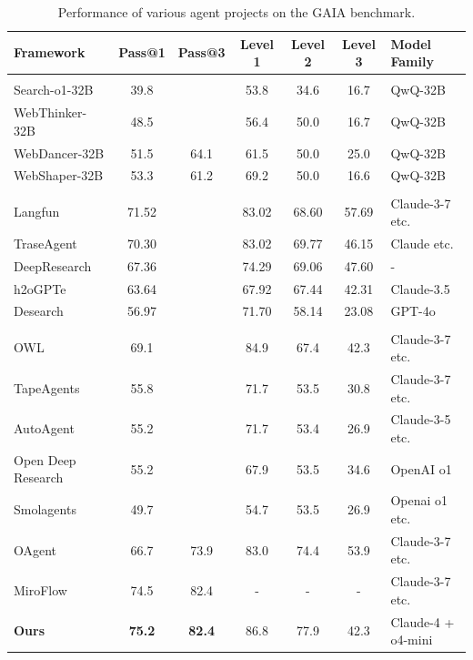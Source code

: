 \begin{table}[!thb]
\centering
\caption{Performance of various agent projects on the GAIA benchmark.}
\label{tab:related}
\begin{tabular}{lcccccl} 
\toprule
\midrule
\textbf{Framework} & \textbf{Pass@1} & \textbf{Pass@3} & \textbf{Level 1} & \textbf{Level 2} & \textbf{Level 3} & \textbf{Model Family} \\
\midrule
\multicolumn{7}{l}{\cellcolor[RGB]{235, 228, 230}{\emph{Agentic Model}}} \\
\midrule
Search-o1-32B
& 39.8 & & 53.8 & 34.6 & 16.7 & QwQ-32B \\
WebThinker-32B
& 48.5 & & 56.4 & 50.0 & 16.7 & QwQ-32B \\
WebDancer-32B
& 51.5 & 64.1 & 61.5 & 50.0 & 25.0 & QwQ-32B \\
WebShaper-32B
& 53.3 & 61.2 & 69.2 & 50.0 & 16.6 & QwQ-32B \\
\midrule
\multicolumn{7}{l}{\cellcolor[RGB]{235, 216, 221}{\emph{Closed-source Agent Frameworks}}} \\
\midrule
Langfun
& 71.52 & & 83.02 & 68.60 & 57.69 & Claude-3-7 etc.\@ \\
TraseAgent
& 70.30 & & 83.02 & 69.77 & 46.15 & Claude etc.\@ \\
DeepResearch
& 67.36 & & 74.29 & 69.06 & 47.60 & - \\
h2oGPTe
& 63.64 & & 67.92 & 67.44 & 42.31 & Claude-3.5  \\
Desearch
& 56.97 & & 71.70 & 58.14 & 23.08 & GPT-4o \\
\midrule
\multicolumn{7}{l}{\cellcolor[RGB]{235, 181, 195}{\emph{Open‐source Agent Frameworks}} }\\
\midrule
OWL
& 69.1 &  & 84.9  & 67.4 & 42.3 & Claude-3-7 etc.\@ \\
TapeAgents
& 55.8 & & 71.7 & 53.5 & 30.8 & Claude-3-7 etc.\@ \\
AutoAgent
& 55.2 & & 71.7 & 53.4 & 26.9 & Claude-3-5 etc.\@ \\
Open Deep Research
& 55.2 & & 67.9 & 53.5 & 34.6 & OpenAI o1 \\
Smolagents
& 49.7 & & 54.7 & 53.5 & 26.9 & Openai o1 etc.\@ \\
OAgent
& 66.7 & 73.9 & 83.0 & 74.4 & 53.9 & Claude-3-7 etc.\@ \\
MiroFlow
& 74.5 & 82.4 & - & - & - & Claude-3-7 etc.\@ \\
\midrule
\textbf{Ours}
& \textbf{75.2} & \textbf{82.4} & 86.8 & 77.9 & 42.3 & Claude-4 + o4-mini\@ \\
\midrule
\bottomrule
\end{tabular}
\end{table}



